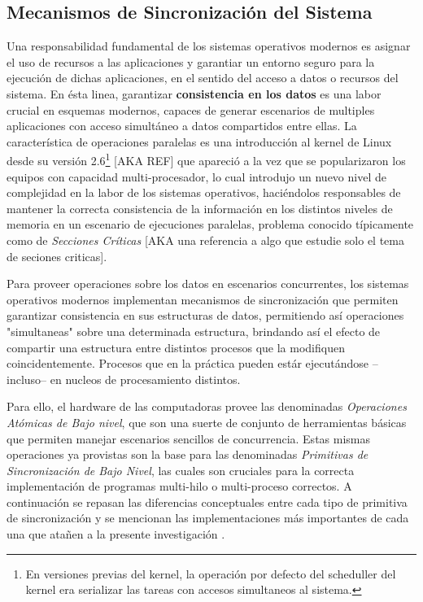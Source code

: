 \subsection{Mecanismos de Sincronización del Sistema}
Una responsabilidad fundamental de los sistemas operativos modernos es asignar el uso de recursos a las aplicaciones y garantiar un entorno seguro para la ejecución de dichas aplicaciones, en el sentido del acceso a datos o recursos del sistema. En ésta linea, garantizar \textbf{consistencia en los datos} es una labor crucial en esquemas modernos, capaces de generar escenarios de multiples aplicaciones con acceso simultáneo a datos compartidos entre ellas. La característica de operaciones paralelas es una introducción al kernel de Linux desde su versión 2.6\footnote{En versiones previas del kernel, la operación por defecto del scheduller del kernel era serializar las tareas con accesos simultaneos al sistema.} [AKA REF] que apareció a la vez que se popularizaron los equipos con capacidad multi-procesador, lo cual introdujo un nuevo nivel de complejidad en la labor de los sistemas operativos, haciéndolos responsables de mantener la correcta consistencia de la información en los distintos niveles de memoria en un escenario de ejecuciones paralelas, problema conocido típicamente como de \emph{Secciones Críticas} [AKA una referencia a algo que estudie solo el tema de seciones criticas].

Para proveer operaciones sobre los datos en escenarios concurrentes, los sistemas operativos modernos implementan mecanismos de sincronización que permiten garantizar consistencia en sus estructuras de datos, permitiendo así operaciones "simultaneas" sobre una determinada estructura, brindando así el efecto de compartir una estructura entre distintos procesos que la modifiquen coincidentemente. Procesos que en la práctica pueden estár ejecutándose --incluso-- en nucleos de procesamiento distintos.

Para ello, el hardware de las computadoras provee las denominadas \emph{Operaciones Atómicas de Bajo nivel}, que son una suerte de conjunto de herramientas básicas que permiten manejar escenarios sencillos de concurrencia. Estas mismas operaciones ya provistas son la base para las denominadas \emph{Primitivas de Sincronización de Bajo Nivel}, las cuales son cruciales para la correcta implementación de programas multi-hilo o multi-proceso correctos. A continuación se repasan las diferencias conceptuales entre cada tipo de primitiva de sincronización y se mencionan las implementaciones más importantes de cada una que atañen a la presente investigación \cite{book:SOConcepts}.

